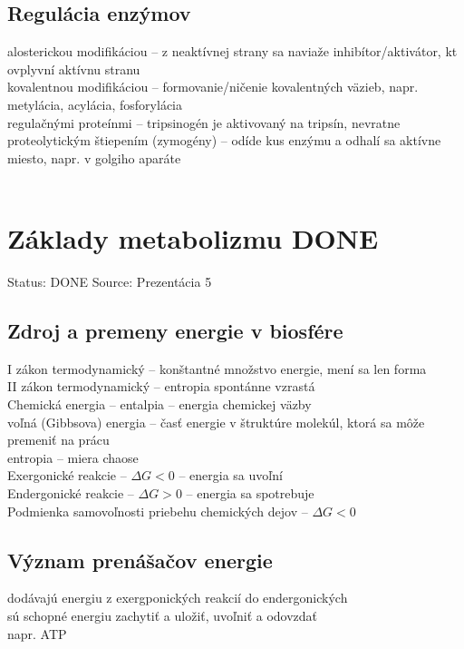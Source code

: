 \subsection*{Regulácia enzýmov}
alosterickou modifikáciou -- z neaktívnej strany sa naviaže inhibítor/aktivátor, kt ovplyvní aktívnu stranu\\
kovalentnou modifikáciou -- formovanie/ničenie kovalentných väzieb, napr. metylácia, acylácia, fosforylácia\\
regulačnými proteínmi -- tripsinogén je aktivovaný na tripsín, nevratne\\
proteolytickým štiepením (zymogény) -- odíde kus enzýmu a odhalí sa aktívne miesto, napr. v golgiho aparáte\\
\\
\section{Základy metabolizmu DONE}

Status: DONE
Source: Prezentácia 5

\subsection*{Zdroj a premeny energie v biosfére}
I zákon termodynamický -- konštantné množstvo energie, mení sa len forma\\
II zákon termodynamický -- entropia spontánne vzrastá\\
Chemická energia -- entalpia -- energia chemickej väzby\\
voľná (Gibbsova) energia -- časť energie v štruktúre molekúl, ktorá sa môže premeniť na prácu\\
entropia -- miera chaose\\
Exergonické reakcie -- $\Delta G < 0$ -- energia sa uvoľní\\
Endergonické reakcie -- $\Delta G> 0$ -- energia sa spotrebuje\\
Podmienka samovoľnosti priebehu chemických dejov -- $\Delta G < 0$\\
\subsection*{Význam prenášačov energie}
dodávajú energiu z exergponických reakcií do endergonických\\
sú schopné energiu zachytiť a uložiť, uvoľniť a odovzdať\\
napr. ATP\\
